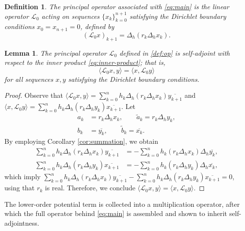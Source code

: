 \documentclass[12pt,reqno]{amsart}
\newtheorem{defi}[thm]{Definition}
\newtheorem{lem}[thm]{Lemma}
\numberwithin{equation}{section}
\begin{document}
\begin{defi}
The \emph{principal operator} associated with \eqref{eq:main} is the linear operator $\mathcal{L}_0$ acting on sequences $\{x_k\}_{k=0}^{n+1}$ satisfying the Dirichlet boundary conditions $x_0 = x_{n+1} = 0$, defined by
\begin{equation}
    \label{def:op}
    (\mathcal{L}_0 x)_{k+1} = \Delta_h(r_k \Delta_h x_k).
\end{equation}
\end{defi}
\begin{lem}
\label{lem:opL0}
The principal operator $\mathcal{L}_0$ defined in \eqref{def:op} is self-adjoint with respect to the inner product \eqref{eq:inner-product}; that is,
\[
\langle \mathcal{L}_0 x, y \rangle = \langle x, \mathcal{L}_0 y \rangle
\]
for all sequences $x, y$ satisfying the Dirichlet boundary conditions.
\end{lem}
\begin{proof}
Observe that $\langle \mathcal{L}_0x,y \rangle = \displaystyle\sum_{k=0}^{n}h_k\Delta_h(r_k \Delta_h x_{k})\overline{y_{k+1}}$ and $\langle x,\mathcal{L}_0y \rangle = \displaystyle\sum_{k=0}^{n}h_k\Delta_h(r_k \Delta_h y_{k})\overline{x_{k+1}}$. Let 
\begin{align*}
a_k &= r_k\Delta_h x_k,  \qquad \widetilde{a}_k = r_k\Delta_h y_k,\\
b_k &= \overline{y_k}, \qquad \widetilde{b}_k=\overline{x_k}.
\end{align*}
By employing Corollary \ref{cor:summation}, we obtain
\begin{align*}
    \displaystyle\sum_{k=0}^{n}h_k\Delta_h(r_k\Delta_hx_k)\overline{y_{k+1}} &= -\displaystyle\sum_{k=0}^{n}h_k(r_k\Delta_hx_k)\Delta_h\overline{y_k},\\
     \displaystyle\sum_{k=0}^{n}h_k\Delta_h(r_k\Delta_hy_k)\overline{x_{k+1}} &= -\displaystyle\sum_{k=0}^{n}h_k(r_k\Delta_hy_k)\Delta_h\overline{x_k},
\end{align*}
which imply $\displaystyle\sum_{k=0}^{n}h_k\Delta_h(r_k \Delta_h x_{k})\overline{y_{k+1}}-\displaystyle\sum_{k=0}^{n}h_k\Delta_h(r_k \Delta_h y_{k})\overline{x_{k+1}}=0$, using that $r_k$ is real. Therefore, we conclude $\langle \mathcal{L}_0x,y \rangle= \langle x,\mathcal{L}_0y \rangle$.
\end{proof}

The lower-order potential term is collected into a multiplication operator, after which the full operator behind \eqref{eq:main} is assembled and shown to inherit self-adjointness.
\end{document}
